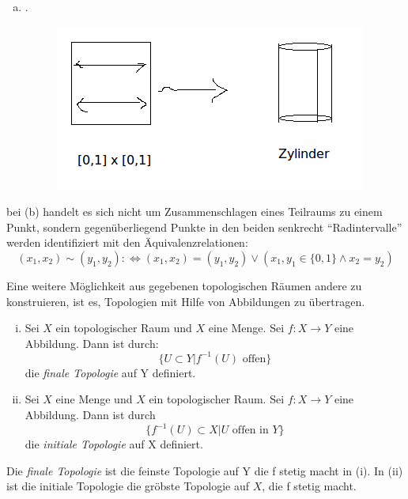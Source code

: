 \documentclass[a4paper,10pt]{scrartcl}
\renewcommand{\equiv}{\Longleftrightarrow}
\begin{document}
\begin{ex*}
\begin{enumerate}[(i)]
\begin{enumerate}[(a)]
\begin{figure}[H]
\caption{}
\end{figure}
\item .
\begin{figure}[H]
\centering
 \includegraphics[scale=0.6]{fig11.png}
\caption{}
\end{figure}
\end{enumerate}
bei (b) handelt es sich nicht um Zusammenschlagen eines Teilraums zu einem Punkt, sondern gegenüberliegend Punkte in den beiden senkrecht "`Radintervalle"' werden identifiziert mit den Äquivalenzrelationen: \fixme[nachschauen]
\[
(x_1,x_2)\sim (y_1,y_2):\equiv (x_1,x_2)=(y_1,y_2)\lor (x_1,y_1 \in \{0,1\} \land x_2 =y_2)
\]
\end{enumerate}
\end{ex*}
Eine weitere Möglichkeit aus gegebenen topologischen Räumen andere zu konstruieren, ist es, Topologien mit Hilfe von Abbildungen zu übertragen.
\begin{df}\label{thm:2.5}
\begin{enumerate}[(i)]
\item Sei $ X $ ein topologischer Raum und $ X $ eine Menge.  Sei $ f: X\to Y$ eine Abbildung.  Dann ist durch:
\[
\{U\subset Y|f^{-1}(U) \text{ offen} \}
\]
die \emph{finale Topologie} auf Y definiert.
\item Sei $ X $ eine Menge und $ X $ ein topologischer Raum.  Sei $ f: X\to Y $ eine Abbildung.  Dann ist durch 
\[
\{ f^{-1}(U)\subset X| U \text{ offen in } Y\}
\]
die \emph{initiale Topologie} auf X definiert.
\end{enumerate}
\end{df}
\begin{note*}
Die \emph{finale Topologie} ist die feinste Topologie auf Y die f stetig macht in (i). In (ii) ist die initiale Topologie die gröbste Topologie auf $ X $, die f stetig macht.
\end{note*}
\end{document}
